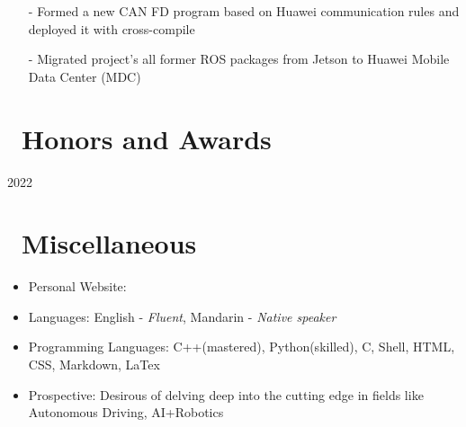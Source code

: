 \documentclass{resume}
\begin{document}
\begin{itemize}
  \item[-] Formed a new CAN FD program based on Huawei communication rules and deployed it with cross-compile
  \item[-] Migrated project's all former ROS packages from Jetson to Huawei Mobile Data Center (MDC)
\end{itemize}


\section{\faTrophy\ Honors and Awards}
 {2022}

\section{\faCogs\ Miscellaneous}
\begin{itemize}[parsep=0.5ex]
  \item Personal Website: 
  \item Languages: English - \textit{Fluent}, Mandarin - \textit{Native speaker}
  \item Programming Languages: C++(mastered), Python(skilled), C, Shell, HTML, CSS, Markdown, LaTex
  \item Prospective: Desirous of delving deep into the cutting edge in fields like Autonomous Driving, AI+Robotics
\end{itemize}

%
%
\end{document}
